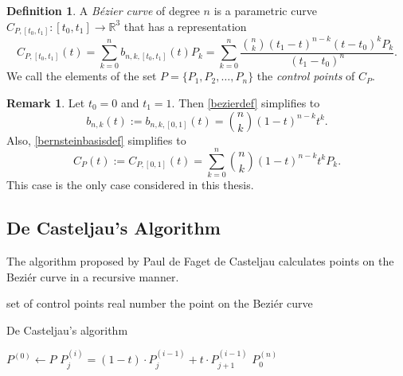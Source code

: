 \documentclass[a4paper, 11pt]{report}
\theoremstyle{definition}
\newtheorem{definition}{Definition}[section]
\newtheorem*{remark}{Remark}
\renewcommand{\emph}[1]{\textit{#1}}
\newcommand{\Desc}[2]{\State \makebox[12em][l]{#1}#2}
\begin{document}
\begin{definition}
	A \emph{Bézier curve} of degree $n$ is a parametric curve $C_{P,[t_0, t_1]}: [t_0, t_1] \rightarrow \mathbb{R}^3$ that has a representation
	\begin{equation}\label{bezierdef}
		C_{P, [t_0, t_1]}(t) = \sum_{k=0}^n b_{n,k,[t_0, t_1]}(t) P_k = \sum_{k=0}^n \frac{\binom{n}{k} (t_1-t)^{n-k}(t-t_0)^k P_k}{(t_1-t_0)^n}.
	\end{equation}
	We call the elements of the set $P = \{P_1, P_2, \dots, P_n\}$ the \emph{control points} of $C_P$.
\end{definition}

\begin{remark}
	Let $t_0 = 0$ and $t_1 = 1$. Then \ref{bezierdef} simplifies to
	\begin{equation}
		b_{n,k}(t) := b_{n,k,[0,1]}(t) = \binom{n}{k} (1-t)^{n-k}t^k.
	\end{equation}
	Also, \ref{bernsteinbasisdef} simplifies to
	\begin{equation}
		C_P(t) := C_{P,[0,1]}(t)= \sum_{k=0}^n \binom{n}{k} (1-t)^{n-k}t^k P_k.
	\end{equation}
	This case is the only case considered in this thesis.
\end{remark}

\subsection{De Casteljau's Algorithm}
The algorithm proposed by Paul de Faget de Casteljau calculates points on the Beziér curve in a recursive manner.
\begin{algorithm}
	\begin{algorithmic}
		\Input
			\Desc{$P = \{P_0, P_1, ..., P_n\}$}{set of control points}
			\Desc{$t$}{real number}
		\EndInput
		\Output
			\Desc{$P^{(n)}_0 = C_P(t)$}{the point on the Beziér curve}
		\EndOutput

		\caption{De Casteljau's algorithm}\label{casteljaualgo}
			\State $P^{(0)} \gets P$
					\State $P^{(i)}_j = (1-t) \cdot P^{(i-1)}_j + t \cdot P^{(i-1)}_{j+1}$
				\EndFor
			\EndFor
			\Return $P^{(n)}_0$
		\EndProcedure
	\end{algorithmic}
\end{algorithm}
\end{document}
